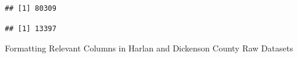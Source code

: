 \documentclass[12pt,]{article}
\newenvironment{Shaded}{\begin{snugshade}}{\end{snugshade}}
\newcommand{\DataTypeTok}[1]{\textcolor[rgb]{0.13,0.29,0.53}{#1}}
\newcommand{\KeywordTok}[1]{\textcolor[rgb]{0.13,0.29,0.53}{\textbf{#1}}}
\newcommand{\NormalTok}[1]{#1}
\newcommand{\OperatorTok}[1]{\textcolor[rgb]{0.81,0.36,0.00}{\textbf{#1}}}
\newcommand{\OtherTok}[1]{\textcolor[rgb]{0.56,0.35,0.01}{#1}}
\begin{document}
\begin{verbatim}
## [1] 80309
\end{verbatim}

\begin{Shaded}
\end{Shaded}

\begin{verbatim}
## [1] 13397
\end{verbatim}

Formatting Relevant Columns in Harlan and Dickenson County Raw Datasets
\end{document}

